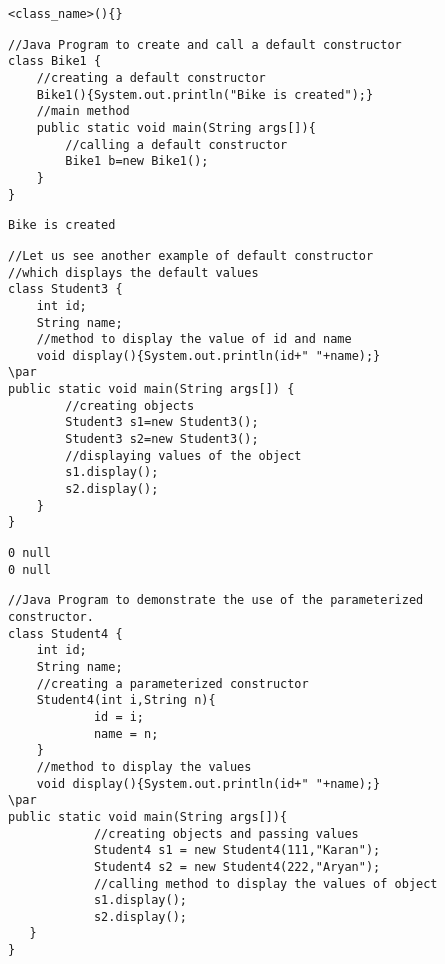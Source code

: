\documentclass{book}
\def\lthtmlcheckvsize{\ifdim\ht\sizebox<\vsize 
  \ifdim\wd\sizebox<\hsize\expandafter\hfill\fi \expandafter\vfill
  \else\expandafter\vss\fi}%
\begin{document}
{\newpage\clearpage
{}%
\begin{lstlisting}
<class_name>(){}  
\end{lstlisting}%
\lthtmlfigureZ
\lthtmlcheckvsize\clearpage}

{\newpage\clearpage
{}%
\begin{lstlisting}
//Java Program to create and call a default constructor  
class Bike1 {  
	//creating a default constructor  
	Bike1(){System.out.println("Bike is created");}  
	//main method  
	public static void main(String args[]){  
		//calling a default constructor  
		Bike1 b=new Bike1();  
	}  
}  
\end{lstlisting}%
\lthtmlfigureZ
\lthtmlcheckvsize\clearpage}

{\newpage\clearpage
{}%
\begin{lstlisting}
Bike is created
\end{lstlisting}%
\lthtmlfigureZ
\lthtmlcheckvsize\clearpage}

{\newpage\clearpage
{}%
\begin{lstlisting}
//Let us see another example of default constructor  
//which displays the default values  
class Student3 {  
	int id;  
	String name;  
	//method to display the value of id and name  
	void display(){System.out.println(id+" "+name);}  
\par
public static void main(String args[]) {  
		//creating objects  
		Student3 s1=new Student3();  
		Student3 s2=new Student3();  
		//displaying values of the object  
		s1.display();  
		s2.display();  
	}  
}  
\end{lstlisting}%
\lthtmlfigureZ
\lthtmlcheckvsize\clearpage}

{\newpage\clearpage
{}%
\begin{lstlisting} 
0 null
0 null
\end{lstlisting}%
\lthtmlfigureZ
\lthtmlcheckvsize\clearpage}

{\newpage\clearpage
{}%
\begin{lstlisting}
//Java Program to demonstrate the use of the parameterized constructor.  
class Student4 {  
    int id;  
    String name;  
    //creating a parameterized constructor  
    Student4(int i,String n){  
			id = i;  
			name = n;  
    }  
    //method to display the values  
    void display(){System.out.println(id+" "+name);}  
\par
public static void main(String args[]){  
			//creating objects and passing values  
			Student4 s1 = new Student4(111,"Karan");  
			Student4 s2 = new Student4(222,"Aryan");  
			//calling method to display the values of object  
			s1.display();  
			s2.display();  
   }  
}  
\end{lstlisting}%
\lthtmlfigureZ
\lthtmlcheckvsize\clearpage}
\end{document}

